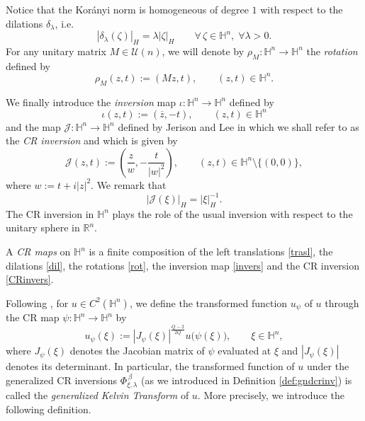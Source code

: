 \documentclass[reqno]{amsart}
\theoremstyle{definition}
\theoremstyle{remark}
\numberwithin{equation}{section}
\begin{document}
Notice that the Kor\'anyi norm is
homogeneous of degree $1$ with respect to the dilations
$\delta_\lambda$, i.e.
\begin{equation}\label{eqn:dilationnorm}
|\delta_\lambda(\zeta)|_{\! H}=\lambda|\zeta|_{\! H} \qquad\forall\,\zeta\in\mathbb{H}^n,\; \forall\lambda>0.
\end{equation}
For any unitary matrix $M\in \mathcal{U}(n)$, we will denote by
$\rho_{\! M}:\mathbb{H}^n\rightarrow\mathbb{H}^n$ the \emph{rotation} defined
by
\begin{equation}\label{rot}
\rho_{\! M}(z,t):=(Mz,t), \qquad (z,t)\in\mathbb{H}^n.
\end{equation}



We finally introduce the \emph{inversion} map
$\iota:\mathbb{H}^n\rightarrow\mathbb{H}^n$ defined by
\begin{equation}\label{invers}
\iota(z,t):=(\overline{z},-t), \qquad (z,t)\in\mathbb{H}^n
\end{equation}
and the map
$\mathscr{J}:\mathbb{H}^n\rightarrow\mathbb{H}^n$ defined by Jerison and Lee in
\cite{JL88} which we shall refer to as the \emph{CR inversion}
and which is given by
\begin{equation}\label{CRinvers}
\mathscr{J}(z,t):=\left(\frac {z}{w},-\frac {t}{|w|^2}\right), \qquad (z,t)\in\mathbb{H}^n\setminus \{(0,0)\},
\end{equation}
where $w:=t+i|z|^2$. We remark that
\begin{equation}\label{eqn:inv_norm}
\left|\mathscr{J}(\xi)\right|_{\! H}=|\xi|_{\! H}^{-1}. 
\end{equation}
The CR inversion in $\mathbb{H}^n$ plays the role of the usual inversion with respect to the
unitary sphere in $\mathbb{R}^n$.


A \emph{CR maps} on $\mathbb{H}^n$ is a finite composition of  
the left translations \eqref{trasl}, the dilations \eqref{dil},
the rotations \eqref{rot}, the inversion map \eqref{invers}
and the CR inversion \eqref{CRinvers}.


  

Following \cite{LM12}, for $u\in C^2(\mathbb{H}^n)$, we define the transformed function $u_\psi$ of $u$ through 
the CR map $\psi:\mathbb{H}^n\to \mathbb{H}^n$ by 
\begin{equation}
u_\psi(\xi):=|J_\psi(\xi)|^\frac{Q-2}{2Q}u\big(\psi(\xi)\big),\qquad\xi\in\mathbb{H}^n,
\end{equation}
where $J_\psi(\xi)$ denotes the Jacobian matrix of $\psi$ evaluated at
$\xi$ and $|J_\psi(\xi)|$ denotes its determinant.
In particular, the transformed function of $u$ under 
the generalized CR inversions $\Phi_{\xi, \lambda}^{\, \beta}$
(as we introduced in Definition \ref{def:gndcrinv})
is called the \emph{generalized Kelvin Transform} of $u$.
More precisely, we introduce the following definition.
\end{document}

